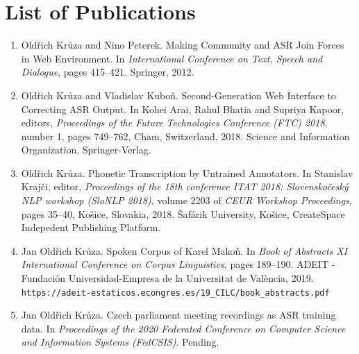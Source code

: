 \documentclass[12pt,a4paper]{report}
\begin{document}



\chapter*{List of Publications}

\begin{enumerate}
\item{
    Oldřich Krůza and Nino Peterek.
    Making Community and ASR Join Forces in Web Environment.
    In \textit{International Conference on Text, Speech and Dialogue},
    pages 415--421.
    Springer, 2012.
}
\item{
    Oldřich Krůza and Vladislav Kuboň.
    Second-Generation Web Interface to Correcting ASR Output.
    In Kohei Arai, Rahul Bhatia and Supriya Kapoor, editors,
    \textit{Proceedings of the Future Technologies Conference (FTC) 2018},
    number 1, pages 749--762, Cham, Switzerland, 2018.
    Science and Information Organization, Springer-Verlag.
}
\item{
    Oldřich Krůza.
    Phonetic Transcription by Untrained Annotators.
    In Stanislav Krajči, editor,
    \textit{Proceedings of the 18th conference ITAT 2018:
    Slovenskočeský NLP workshop (SloNLP 2018)},
    volume 2203 of \textit{CEUR Workshop Proceedings},
    pages 35--40,
    Košice, Slovakia, 2018.
    Šafárik University, Košice,
    CreateSpace Indepedent Publishing Platform.
}
\item{
   Jan Oldřich Krůza.
   Spoken Corpus of Karel Makoň.  
   In \textit{Book of Abstracts XI International Conference on Corpus Linguistics},
   pages 189--190.
   ADEIT - Fundación Universidad-Empresa de la Universitat de València, 2019.\\
   \texttt{https://adeit-estaticos.econgres.es/19\_CILC/book\_abstracts.pdf}
}
\item{
  Jan Oldřich Krůza.
  Czech parliament meeting recordings as ASR training data.
  In \textit{Proceedings of the 2020 Federated Conference on Computer Science
  and Information Systems (FedCSIS)}.
  Pending.
}
\end{enumerate}
\end{document}
